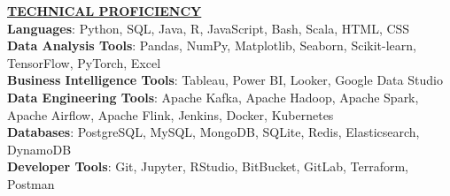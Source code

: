 \documentclass{article}
\begin{document}
\noindent \textbf{\underline{TECHNICAL PROFICIENCY}} \\
\textbf{Languages}{: \small Python, SQL, Java, R, JavaScript, Bash, Scala, HTML, CSS} \\
\textbf{Data Analysis Tools}{: \small Pandas, NumPy, Matplotlib, Seaborn, Scikit-learn, TensorFlow, PyTorch, Excel} \\
\textbf{Business Intelligence Tools}{: \small Tableau, Power BI, Looker, Google Data Studio} \\
\textbf{Data Engineering Tools}{: \small Apache Kafka, Apache Hadoop, Apache Spark, Apache Airflow, Apache Flink, Jenkins, Docker, Kubernetes} \\
\textbf{Databases}{: \small PostgreSQL, MySQL, MongoDB, SQLite, Redis, Elasticsearch, DynamoDB} \\
\textbf{Developer Tools}{: \small Git, Jupyter, RStudio, BitBucket, GitLab, Terraform, Postman} \\
\end{document}
